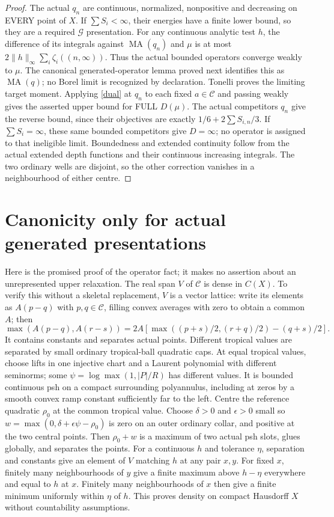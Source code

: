 \documentclass[11pt]{article}
\newcommand{\MA}{\operatorname{MA}}
\newcommand{\C}{\mathcal C}
\newcommand{\G}{\mathcal G}
\begin{document}
\begin{proof}
The actual $q_n$ are continuous, normalized, nonpositive and decreasing
on EVERY point of $X$. If $\sum S_i<\infty$, their energies have a finite
lower bound, so they are a required $\G$ presentation. For any continuous
analytic test $h$, the difference of its integrals against $\MA(q_n)$
and $\mu$ is at most $2\|h\|_\infty\sum_i\zeta_i((n,\infty))$.
Thus the actual bounded operators converge weakly to $\mu$.
The canonical generated-operator lemma proved next identifies this as
$\MA(q)$; no Borel limit is recognized by declaration.
Tonelli proves the limiting target moment. Applying \eqref{dual} at
$q_n$ to each fixed $a\in\C$ and passing weakly gives the asserted upper
bound for FULL $D(\mu)$. The actual competitors $q_n$ give the reverse
bound, since their objectives are exactly $1/6+2\sum S_{i,n}/3$.
If $\sum S_i=\infty$, these same bounded competitors give $D=\infty$;
no operator is assigned to that ineligible limit. Boundedness and extended
continuity follow from the actual extended depth functions and their
continuous increasing integrals. The two ordinary wells are disjoint,
so the other correction vanishes in a neighbourhood of either centre.
\end{proof}

\section*{Canonicity only for actual generated presentations}
Here is the promised proof of the operator fact; it makes no assertion
about an unrepresented upper relaxation. The real span $V$ of $\C$ is
dense in $C(X)$. To verify this without a skeletal replacement, $V$ is a
vector lattice: write its elements as $A(p-q)$ with $p,q\in\C$, filling
convex averages with zero to obtain a common $A$; then
\[
 \max(A(p-q),A(r-s))=2A[\max((p+s)/2,(r+q)/2)-(q+s)/2].
\]
It contains constants and separates actual points. Different tropical
values are separated by small ordinary tropical-ball quadratic caps.
At equal tropical values, choose lifts in one injective chart and a
Laurent polynomial with different seminorms; some
$\psi=\log\max(1,|P|/R)$ has different values. It is bounded continuous
psh on a compact surrounding polyannulus, including at zeros by a smooth
convex ramp constant sufficiently far to the left. Centre the reference
quadratic $\rho_0$ at the common tropical value. Choose $\delta>0$ and
$\epsilon>0$ small so
$w=\max(0,\delta+\epsilon\psi-\rho_0)$ is zero on an outer ordinary
collar, and positive at the two central points. Then $\rho_0+w$ is a
maximum of two actual psh slots, glues globally, and separates the points.
For a continuous $h$ and tolerance $\eta$, separation and constants give
an element of $V$ matching $h$ at any pair $x,y$. For fixed $x$, finitely
many neighbourhoods of $y$ give a finite maximum above $h-\eta$
everywhere and equal to $h$ at $x$. Finitely many neighbourhoods of $x$
then give a finite minimum uniformly within $\eta$ of $h$. This proves
density on compact Hausdorff $X$ without countability assumptions.
\end{document}

